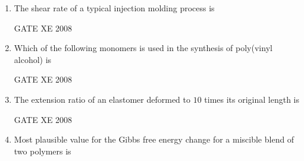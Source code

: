 \documentclass[12pt]{article}
\begin{document}
\begin{enumerate}[label=Q\arabic*.]
\item The shear rate of a typical injection molding process is  

\begin{enumerate}[label=(\Alph*)]
\end{enumerate}

GATE XE 2008

\item Which of the following monomers is used in the synthesis of poly(vinyl alcohol) is  

\begin{enumerate}[label=(\Alph*)]
\end{enumerate}

GATE XE 2008

\item The extension ratio of an elastomer deformed to $10$ times its original length is  

\begin{enumerate}[label=(\Alph*)]
\end{enumerate}

GATE XE 2008

\item Most plausible value for the Gibbs free energy change for a miscible blend of two polymers is  

\begin{enumerate}[label=(\Alph*)]
\end{enumerate}


\end{enumerate}
\end{document}
